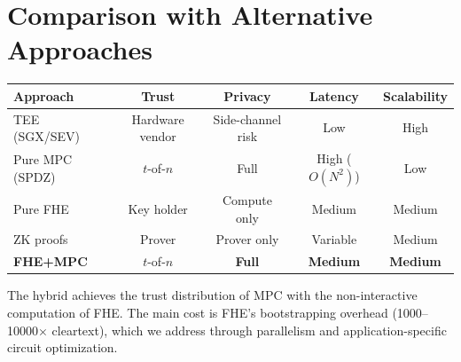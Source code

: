 \section{Comparison with Alternative Approaches}


\begin{center}
\begin{tabular}{lcccc}
\toprule
\textbf{Approach} & \textbf{Trust} & \textbf{Privacy} & \textbf{Latency} & \textbf{Scalability} \\
\midrule
TEE (SGX/SEV) & Hardware vendor & Side-channel risk & Low & High \\
Pure MPC (SPDZ) & $t$-of-$n$ & Full & High ($O(N^2)$) & Low \\
Pure FHE & Key holder & Compute only & Medium & Medium \\
ZK proofs & Prover & Prover only & Variable & Medium \\
\textbf{FHE+MPC} & $t$-of-$n$ & \textbf{Full} & \textbf{Medium} & \textbf{Medium} \\
\bottomrule
\end{tabular}
\end{center}

The hybrid achieves the trust distribution of MPC with the non-interactive computation of FHE. The main cost is FHE's bootstrapping overhead (1000--10000$\times$ cleartext), which we address through parallelism and application-specific circuit optimization.

